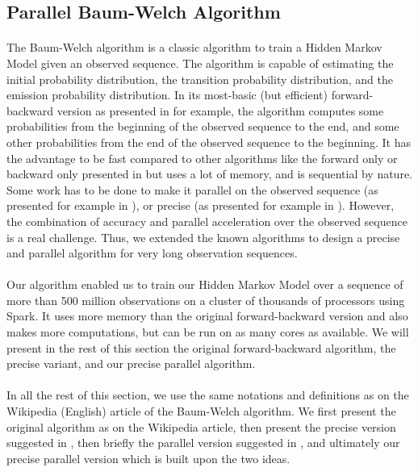 \subsection{Parallel Baum-Welch Algorithm}
\paragraph{}
The Baum-Welch algorithm is a classic algorithm to train a Hidden Markov Model given an observed sequence. The algorithm is capable of estimating the initial probability distribution, the transition probability distribution, and the emission probability distribution. In its most-basic (but efficient) forward-backward version as presented in \cite{rabiner1989tutorial} for example, the algorithm computes some probabilities from the beginning of the observed sequence to the end, and some other probabilities from the end of the observed sequence to the beginning. It has the advantage to be fast compared to other algorithms like the forward only or backward only presented in \cite{turin1998unidirectional} but uses a lot of memory, and is sequential by nature. Some work has to be done to make it parallel on the observed sequence (as presented for example in \cite{turin1998unidirectional}), or precise (as presented for example in \cite{rabiner1989tutorial}). However, the combination of accuracy and parallel acceleration over the observed sequence is a real challenge. Thus, we extended the known algorithms to design a precise and parallel algorithm for very long observation sequences.

\paragraph{}
Our algorithm enabled us to train our Hidden Markov Model over a sequence of more than 500 million observations on a cluster of thousands of processors using Spark. It uses more memory than the original forward-backward version and also makes more computations, but can be run on as many cores as available. We will present in the rest of this section the original forward-backward algorithm, the precise variant, and our precise parallel algorithm.

\paragraph{}
In all the rest of this section, we use the same notations and definitions as on the Wikipedia (English) article of the Baum-Welch algorithm. We first present the original algorithm as on the Wikipedia article, then present the precise version suggested in \cite{rabiner1989tutorial}, then briefly the parallel version suggested in \cite{turin1998unidirectional}, and ultimately our precise parallel version which is built upon the two ideas.

